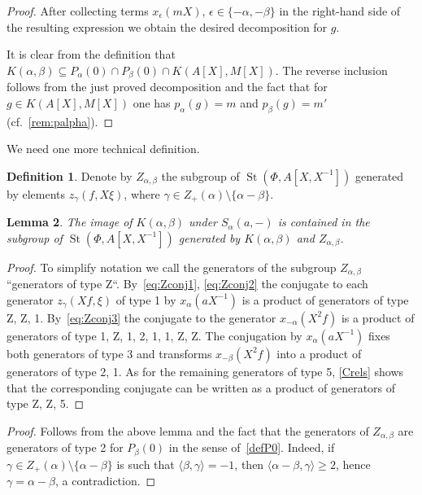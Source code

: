 \documentclass[oneside, 8pt]{amsart}
\newtheorem{lemma}{Lemma}
\newtheorem{corollary}[lemma]{Corollary}
\theoremstyle{remark}
\theoremstyle{definition}
\numberwithin{lemma}{section}
\numberwithin{prop}{section}
\numberwithin{corollary}{section}
\newtheorem{df}[lemma]{Definition} \Crefname{df}{Definition}{Definitions}
\DeclareMathOperator{\St}{St}
\numberwithin{equation}{section}
\begin{document}
\begin{proof}
 After collecting terms $x_\epsilon(mX)$, $\epsilon \in \{ -\alpha, -\beta \}$ in the right-hand side of the resulting expression we obtain the desired decomposition for $g$.
 
 It is clear from the definition that $K(\alpha, \beta) \subseteq P_\alpha(0) \cap P_\beta(0) \cap K(A[X], M[X])$. The reverse inclusion follows from the just proved decomposition and the fact that for $g\in K(A[X], M[X])$ one has $p_{\alpha}(g) = m$ and $p_\beta(g) = m'$ (cf.~\cref{rem:palpha}). \end{proof}
 
We need one more technical definition.
\begin{df} Denote by $Z_{\alpha, \beta}$ the subgroup of $\St(\Phi, A[X, X^{-1}])$ generated by elements $z_\gamma(f, X\xi)$, where $\gamma \in Z_+(\alpha) \setminus \{ \alpha - \beta \}$.\end{df}
  
\begin{lemma} \label{image-K-a-b} The image of $K(\alpha, \beta)$ under $S_{\alpha}(a, -)$ is contained in the subgroup of $\St(\Phi, A[X, X^{-1}])$  generated by $K(\alpha, \beta)$ and $Z_{\alpha, \beta}$. \end{lemma}
\begin{proof} To simplify notation we call the generators of the subgroup $Z_{\alpha,\beta}$ ``generators of type Z``. By~\eqref{eq:Zconj1}, \eqref{eq:Zconj2} the conjugate to each generator $z_\gamma(Xf, \xi)$ of type 1 by $x_\alpha(aX^{-1})$ is a product of generators of type Z, Z, 1.
By~\eqref{eq:Zconj3} the conjugate to the generator $x_{-\alpha}(X^2f)$ is a product of generators of type 1, Z, 1, 2, 1, 1, Z, Z.
The conjugation by $x_\alpha(aX^{-1})$ fixes both generators of type 3 and transforms $x_{-\beta}(X^2f)$ into a product of generators of type 2, 1. As for the remaining generators of type 5, \cref{Crels} shows that the corresponding conjugate can be written as a product of generators of type Z, Z, 5. \end{proof}  

\begin{proof} Follows from the above lemma and the fact that the generators of $Z_{\alpha,\beta}$ are generators of type 2 for $P_\beta(0)$ in the sense of~\cref{defP0}.
 Indeed, if $\gamma \in Z_+(\alpha) \setminus \{ \alpha - \beta \}$ is such that $\langle \beta, \gamma \rangle = -1$, then $ \langle \alpha - \beta, \gamma \rangle \geq 2$, hence
  $\gamma = \alpha - \beta$, a contradiction. \end{proof}
\end{document}
